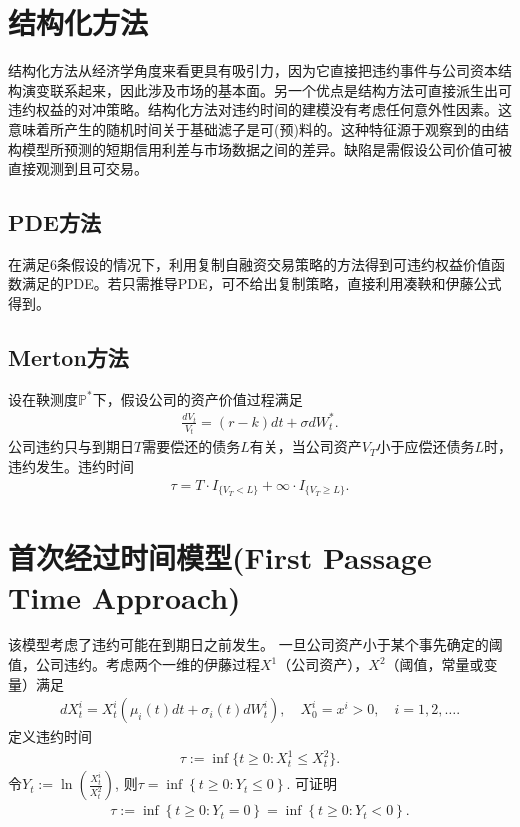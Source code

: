 \documentclass{article}
\begin{document}
\section{结构化方法}
结构化方法从经济学角度来看更具有吸引力，因为它直接把违约事件与公司资本结构演变联系起来，因此涉及市场的基本面。另一个优点是结构方法可直接派生出可违约权益的对冲策略。结构化方法对违约时间的建模没有考虑任何意外性因素。这意味着所产生的随机时间关于基础滤子是可(预)料的。这种特征源于观察到的由结构模型所预测的短期信用利差与市场数据之间的差异。缺陷是需假设公司价值可被直接观测到且可交易。

\subsection{PDE方法}
在满足6条假设的情况下，利用复制自融资交易策略的方法得到可违约权益价值函数满足的PDE。若只需推导PDE，可不给出复制策略，直接利用凑鞅和伊藤公式得到。






\subsection{Merton方法}
设在鞅测度$\mathbb{P}^*$下，假设公司的资产价值过程满足
\begin{eqnarray}
  \frac{dV_t}{V_t} = (r - k)dt +\sigma dW_t^*.
\end{eqnarray}
公司违约只与到期日$T$需要偿还的债务$L$有关，当公司资产$V_T$小于应偿还债务$L$时，违约发生。违约时间
\begin{eqnarray}
  \tau = T\cdot I_{\{V_T<L\}} +\infty \cdot I_{\{V_T\ge L\}}.
\end{eqnarray}


\section{首次经过时间模型(First Passage Time Approach)}
该模型考虑了违约可能在到期日之前发生。
一旦公司资产小于某个事先确定的阈值，公司违约。考虑两个一维的伊藤过程$X^1$（公司资产），$X^2$（阈值，常量或变量）满足
\begin{eqnarray}
  dX_t^i = X_t^i\left(\mu_i(t)dt + \sigma_i(t)dW_t^i\right),\quad X_0^i = x^i >0,\quad i=1,2,\ldots.
\end{eqnarray}
定义违约时间
\begin{eqnarray}
  \tau := \inf\{t\ge 0: X_t^1 \le X_t^2\}.
\end{eqnarray}
令$Y_t := \ln\left(\frac{X_t^i}{X_t^2}\right)$, 则$\tau = \inf\left\{t\ge 0: Y_t\le 0\right\}$. 可证明
\begin{eqnarray}
  \tau := \inf\left\{t\ge 0: Y_t = 0\right\} =  \inf\left\{t\ge 0: Y_t < 0\right\}.
\end{eqnarray}
\end{document}
